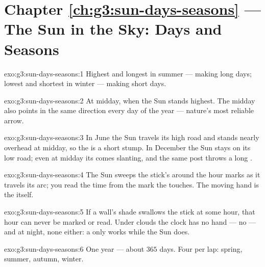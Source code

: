 \section*{Chapter \ref{ch:g3:sun-days-seasons} --- The Sun in the Sky: Days and Seasons}

\begin{solution}{exo:g3:sun-days-seasons:1}
Highest and longest in summer --- making long days; lowest and
shortest in winter --- making short days.
\end{solution}

\begin{solution}{exo:g3:sun-days-seasons:2}
At midday, when the Sun stands highest. The midday  also
points in the same direction every day of the year --- nature's most
reliable arrow.
\end{solution}

\begin{solution}{exo:g3:sun-days-seasons:3}
In June the Sun travels its high road and stands nearly overhead at
midday, so the  is a short stump. In December the Sun stays on
its low road; even at midday its  comes slanting, and the same
post throws a long .
\end{solution}

\begin{solution}{exo:g3:sun-days-seasons:4}
The Sun sweeps the stick's  around the hour marks as it
travels its arc; you read the time from the mark the  touches.
The moving hand is the  itself.
\end{solution}

\begin{solution}{exo:g3:sun-days-seasons:5}
If a wall's shade swallows the stick at some hour, that hour can
never be marked or read. Under clouds the clock has no hand ---
no  --- and at night, none either: a  only works while
the Sun does.
\end{solution}

\begin{solution}{exo:g3:sun-days-seasons:6}
One year --- about $365$ days. Four  per lap: spring, summer,
autumn, winter.
\end{solution}

